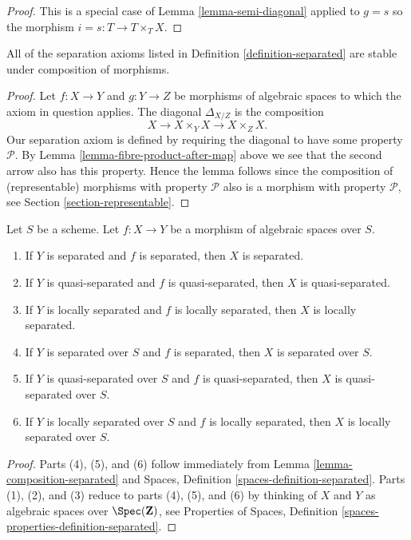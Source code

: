 \begin{proof}
This is a special case of Lemma \ref{lemma-semi-diagonal} applied to
$g = s$ so the morphism $i = s : T \to T \times_T X$.
\end{proof}

\begin{lemma}
\label{lemma-composition-separated}
All of the separation axioms listed in Definition \ref{definition-separated}
are stable under composition of morphisms.
\end{lemma}

\begin{proof}
Let $f : X \to Y$ and $g : Y \to Z$ be morphisms of algebraic spaces
to which the axiom in question applies.
The diagonal $\Delta_{X/Z}$ is the composition
$$
X \longrightarrow X \times_Y X \longrightarrow X \times_Z X.
$$
Our separation axiom is defined by requiring the diagonal
to have some property $\mathcal{P}$. By
Lemma \ref{lemma-fibre-product-after-map} above we see that
the second arrow also has this property. Hence the lemma follows
since the composition of (representable) morphisms with property
$\mathcal{P}$ also is a morphism with property $\mathcal{P}$, see
Section \ref{section-representable}.
\end{proof}

\begin{lemma}
\label{lemma-separated-over-separated}
Let $S$ be a scheme.
Let $f : X \to Y$ be a morphism of algebraic spaces over $S$.
\begin{enumerate}
\item If $Y$ is separated and $f$ is separated, then $X$ is separated.
\item If $Y$ is quasi-separated and $f$ is quasi-separated, then
$X$ is quasi-separated.
\item If $Y$ is locally separated and $f$ is locally separated, then
$X$ is locally separated.
\item If $Y$ is separated over $S$ and $f$ is separated, then
$X$ is separated over $S$.
\item If $Y$ is quasi-separated over $S$ and $f$ is quasi-separated, then
$X$ is quasi-separated over $S$.
\item If $Y$ is locally separated over $S$ and $f$ is locally separated, then
$X$ is locally separated over $S$.
\end{enumerate}
\end{lemma}

\begin{proof}
Parts (4), (5), and (6) follow immediately from
Lemma \ref{lemma-composition-separated}
and
Spaces, Definition \ref{spaces-definition-separated}.
Parts (1), (2), and (3) reduce to parts (4), (5), and (6) by thinking
of $X$ and $Y$ as algebraic spaces over $\Spec(\mathbf{Z})$, see
Properties of Spaces, Definition \ref{spaces-properties-definition-separated}.
\end{proof}

